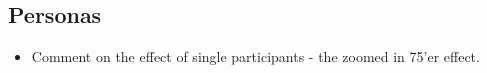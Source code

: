 \subsection{Personas}

\begin{itemize}
\item Comment on the effect of single participants - the zoomed in 75'er effect.
\end{itemize}